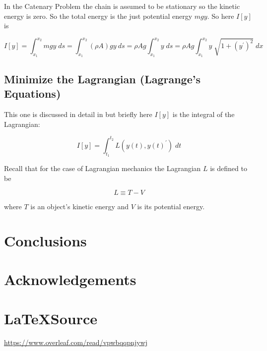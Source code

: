 \documentclass{article}
\theoremstyle{definition}
\begin{document}
\bigskip
\noindent
In the Catenary Problem the chain is assumed to be
stationary so the kinetic energy is zero. So the total energy is
the just potential energy $mgy$. So here $I[y]$ is


\bigskip
\begin{equation*}
I[y]
= \int_{x_1}^{x_2} mgy \; ds
= \int_{x_1}^{x_2} (\rho A) g y \: ds 
= \rho A g \int_{x_1}^{x_2} y \; ds 
= \rho A g\int_{x_1}^{x_2} y \; \sqrt{1 + (y^{\prime})^2} \; dx
\end{equation*}

\medskip
\subsection{Minimize the Lagrangian (Lagrange's Equations)}
This one is discussed in detail in \cite{notes:pola} but briefly
here $I[y]$ is the integral of the Lagrangian:


\bigskip
\begin{equation*}
I[y] = \int_{t_1}^{t_2} L(y(t),y(t)^{\prime}) \; dt
\end{equation*}


\bigskip
\noindent
\bigskip
Recall that for the case of Lagrangian mechanics 
the Lagrangian $L$ is defined to be

\begin{equation*}
L \equiv T - V
\end{equation*}

\bigskip
\noindent
where $T$ is an object's kinetic energy and $V$ 
is its potential energy. 


\section{Conclusions}

\section*{Acknowledgements}
%
%
\section*{\LaTeX Source}
\url{https://www.overleaf.com/read/vpwbqqpnjywj}
%
%
%


%
%
\end{document}
